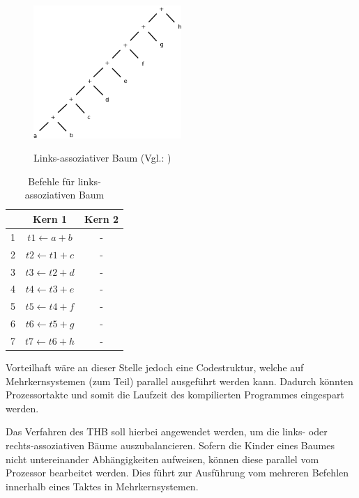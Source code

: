 \begin{figure}
	\begin{center}
		\includegraphics[width=0.5\textwidth]{images/links_assoziativer_baum}\\
	\end{center}
	\caption[Links-assoziativer Baum]{Links-assoziativer Baum (Vgl.: \cite{HeBIS-309344573})}
	\label{fig:links-assoziativer-baum}
\end{figure}

\begin{table}
	\begin{center}
		\begin{tabular}{|c|c|c|}
			\hline  & Kern 1 & Kern 2 \\ 
			\hline 1 & $ t1 \leftarrow a + b $& - \\ 
			\hline 2 & $ t2 \leftarrow t1 + c $& - \\ 
			\hline 3 & $ t3 \leftarrow t2 + d $& - \\ 
			\hline 4 & $ t4 \leftarrow t3 + e $& - \\ 
			\hline 5 & $ t5 \leftarrow t4 + f $& - \\ 
			\hline 6 & $ t6 \leftarrow t5 + g $& - \\ 
			\hline 7 & $ t7 \leftarrow t6 + h $& - \\ 
			\hline 
		\end{tabular}
	\end{center}
	\caption{Befehle für links-assoziativen Baum \cite{HeBIS-309344573}}
	\label{tab:links-assoziativer-baum}
\end{table}


Vorteilhaft wäre an dieser Stelle jedoch eine Codestruktur, welche auf Mehrkernsystemen (zum Teil) parallel ausgeführt werden kann. Dadurch könnten Prozessortakte und somit die Laufzeit des kompilierten Programmes eingespart werden.

Das Verfahren des \ac{THB} soll hierbei angewendet werden, um die links- oder rechts-assoziativen Bäume auszubalancieren. Sofern die Kinder eines Baumes nicht untereinander Abhängigkeiten aufweisen, können diese parallel vom Prozessor bearbeitet werden. Dies führt zur Ausführung vom mehreren Befehlen innerhalb eines Taktes in Mehrkernsystemen.

